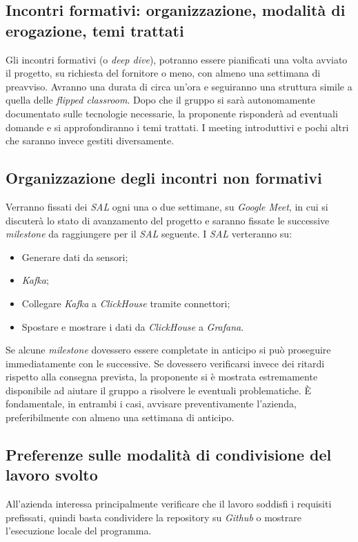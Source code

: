 \subsection{Incontri formativi: organizzazione, modalità di erogazione, temi trattati}
Gli incontri formativi (o \textit{deep dive}), potranno essere pianificati una volta avviato il progetto, su richiesta del fornitore o meno, con almeno una settimana di preavviso. Avranno una durata di circa un'ora e seguiranno una struttura simile a quella delle \textit{flipped classroom}. Dopo che il gruppo si sarà autonomamente documentato sulle tecnologie necessarie, la proponente risponderà ad eventuali domande e si approfondiranno i temi trattati. I meeting introduttivi e pochi altri che saranno invece gestiti diversamente.

\subsection{Organizzazione degli incontri non formativi}
Verranno fissati dei \textit{SAL} ogni una o due settimane, su \textit{Google Meet}, in cui si discuterà lo stato di avanzamento del progetto e saranno fissate le successive \textit{milestone} da raggiungere per il \textit{SAL} seguente. I \textit{SAL} verteranno su:
\begin{itemize}
    \setlength\itemsep{0em}
    \item Generare dati da sensori;
    \item \textit{Kafka};
    \item Collegare \textit{Kafka} a \textit{ClickHouse} tramite connettori;
    \item Spostare e mostrare i dati da \textit{ClickHouse} a \textit{Grafana}.
\end{itemize}
Se alcune \textit{milestone} dovessero essere completate in anticipo si può proseguire immediatamente con le successive. Se dovessero verificarsi invece dei ritardi rispetto alla consegna prevista, la proponente si è mostrata estremamente disponibile ad aiutare il gruppo a risolvere le eventuali problematiche. È fondamentale, in entrambi i casi, avvisare preventivamente l'azienda, preferibilmente con almeno una settimana di anticipo.

\subsection{Preferenze sulle modalità di condivisione del lavoro svolto}
All'azienda interessa principalmente verificare che il lavoro soddisfi i requisiti prefissati, quindi basta condividere la repository su \textit{Github} o mostrare l'esecuzione locale del programma.

